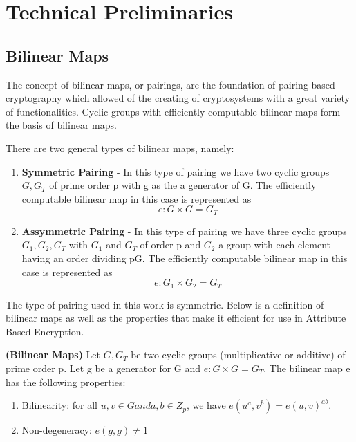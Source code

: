 \section{Technical Preliminaries}

\subsection*{Bilinear Maps}

The concept of bilinear maps, or pairings, are the foundation of pairing based cryptography which allowed of the creating of cryptosystems with a great variety of functionalities. Cyclic groups with efficiently computable bilinear maps form the basis of bilinear maps.

There are two general types of bilinear maps, namely:

\begin{enumerate}
	\item \textbf{Symmetric Pairing\cite{Lynn2007}} - In this type of pairing we have two cyclic groups $ G, G_{T} $ of prime order p with g as the a generator of G. The efficiently computable bilinear map in this case is represented as $$ e \colon G \times G = G_{T} $$
	
	\item \textbf{Assymmetric Pairing\cite{Lynn2007}} - In this type of pairing we have three cyclic groups $ G_{1}, G_{2}, G_{T} $ with $ G_{1} $ and $ G_{T} $ of order p and $ G_{2} $ a group with each element having an order dividing pG. The efficiently computable bilinear map in this case is represented as $$ e \colon G_{1} \times G_{2} = G_{T} $$
	
\end{enumerate}

The type of pairing used in this work is symmetric. Below is a definition of bilinear maps as well as the properties that make it efficient for use in Attribute Based Encryption.

\begin{definition}{\textbf{(Bilinear Maps\cite{Lynn2007})}}
	Let $ G, G_{T} $  be two cyclic groups (multiplicative or additive) of prime order p. Let g be a generator for G and  $  e \colon G \times G = G_{T} $. The bilinear map e has the following properties:
	
	\begin{enumerate}
		
		\item Bilinearity: for all $ u, v \in G and a, b \in Z_{p} $, we have $ e(u^{a}, v^{b}) = e(u, v)^{ab} $.
		
		\item Non-degeneracy: $ e(g, g) \neq 1 $
		
	\end{enumerate}
	
\end{definition}

